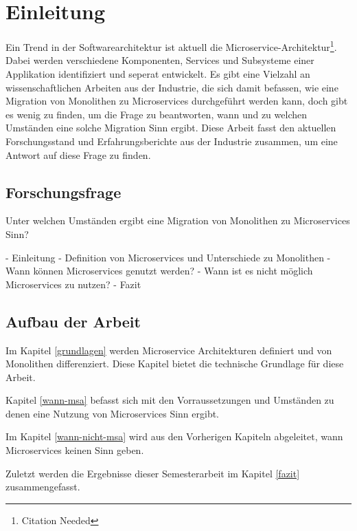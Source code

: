 \newpage
\section{Einleitung} \label{Einleitung}

Ein Trend in der Softwarearchitektur ist aktuell die
Microservice-Architektur\footnote{Citation Needed}. Dabei werden verschiedene
Komponenten, Services und Subsysteme einer Applikation identifiziert und seperat
entwickelt. Es gibt eine Vielzahl an wissenschaftlichen Arbeiten aus der
Industrie, die sich damit befassen, wie eine Migration von Monolithen zu
Microservices durchgeführt werden kann, doch gibt es wenig zu finden, um die
Frage zu beantworten, wann und zu welchen Umständen eine solche Migration Sinn
ergibt. Diese Arbeit fasst den aktuellen Forschungsstand und Erfahrungsberichte
aus der Industrie zusammen, um eine Antwort auf diese Frage zu finden.

\subsection{Forschungsfrage}
Unter welchen Umständen ergibt eine Migration von Monolithen zu Microservices Sinn?

- Einleitung
- Definition von Microservices und Unterschiede zu Monolithen
- Wann können Microservices genutzt werden?
- Wann ist es nicht möglich Microservices zu nutzen?
- Fazit

\subsection{Aufbau der Arbeit}
Im Kapitel \ref{grundlagen} werden Microservice Architekturen definiert und von
Monolithen differenziert. Diese Kapitel bietet die technische Grundlage für
diese Arbeit.

Kapitel \ref{wann-msa} befasst sich mit den Vorraussetzungen und Umständen zu
denen eine Nutzung von Microservices Sinn ergibt.

Im Kapitel \ref{wann-nicht-msa} wird aus den Vorherigen Kapiteln abgeleitet,
wann Microservices keinen Sinn geben.

Zuletzt werden die Ergebnisse dieser Semesterarbeit im Kapitel \ref{fazit}
zusammengefasst.
